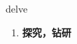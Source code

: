 
\begin{frame}
{\huge delve}
\begin{center}
\begin{enumerate}\Large
  \item \textbf{探究，钻研}
\end{enumerate}
\end{center}
\end{frame}
